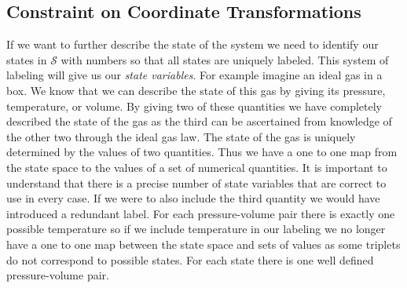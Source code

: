 \documentclass{article}
\begin{document}
\subsection{Constraint on Coordinate Transformations}	

	
	If we want to further describe the state of the system we need to identify our states in $\mathcal{S}$ with numbers so that all states are uniquely labeled. This system of labeling will give us our \textit{state variables}. For example imagine an ideal gas in a box. We know that we can describe the state of this gas by giving its pressure, temperature, or volume. By giving two of these quantities we have completely described the state of the gas as the third can be ascertained from knowledge of the other two through the ideal gas law. The state of the gas is uniquely determined by the values of two quantities. Thus we have a one to one map from the state space to the values of a set of numerical quantities. It is important to understand that there is a precise number of state variables that are correct to use in every case. If we were to also include the third quantity we would have introduced a redundant label. For each pressure-volume pair there is exactly one possible temperature so if we include temperature in our labeling we no longer have a one to one map between the state space and sets of values as some triplets do not correspond to possible states. For each state there is one well defined pressure-volume pair. 
\end{document}
